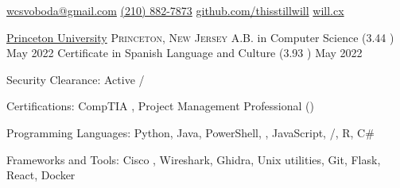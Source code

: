 \documentclass[10pt,letterpaper]{article}
\begin{document}
\sloppy


\nobreakvspace{0.3em}

\noindent\href{mailto:wcsvoboda.at.gmail.dot.com}{wcsvoboda\mbox{}@\mbox{}gmail.com}\sbull
\href{tel:2108827873}{(210) 882-7873}\sbull
\href{https://github.com/thisstillwill}{github.com/thisstillwill}\sbull
\href{https://will.cx}{will.cx}

\spacedhrule{0.9em}{-0.4em}


\headedsection
  {\href{https://www.princeton.edu/}{Princeton University}}
  {\textsc{Princeton, New Jersey}} {%
  \headedsubsection
    {A.B. in Computer Science \textnormal{(3.44 )}}
    {May 2022}
    {}
  \headedsubsection
    {Certificate in Spanish Language and Culture \textnormal{(3.93 )}}
    {May 2022}{}
}


\spacedhrule{0.5em}{-0.4em}


\inlineheadsection
  {Security Clearance:}
  {Active /}

\inlineheadsection
  {Certifications:}
  {CompTIA \SP, Project Management Professional ()}

\inlineheadsection
  {Programming Languages:}
  {Python, Java, PowerShell, , JavaScript, /, R, C\#}

\inlineheadsection
  {Frameworks and Tools:}
  {Cisco , Wireshark, Ghidra, Unix utilities, Git, Flask, React, Docker}
\end{document}
